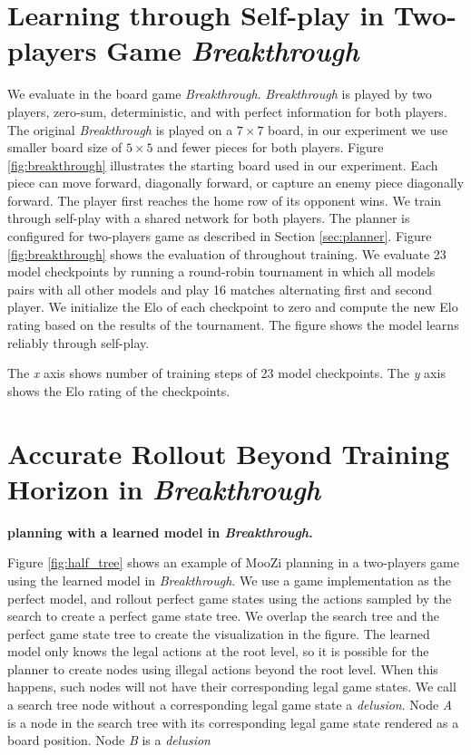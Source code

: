 \section{\moozi Learning through Self-play in Two-players Game \textit{Breakthrough}} \label{sec:exp:breakthrough}
We evaluate \moozi in the board game \textit{Breakthrough}.
\textit{Breakthrough} is played by two players, zero-sum, deterministic, and with perfect information for both players.
The original \textit{Breakthrough} is played on a $7 \times 7$ board, in our experiment we use smaller board size of \(5 \times 5\) and fewer pieces for both players.
Figure \ref{fig:breakthrough} illustrates the starting board used in our experiment.
Each piece can move forward, diagonally forward, or capture an enemy piece diagonally forward.
The player first reaches the home row of its opponent wins.
We train \moozi through self-play with a shared network for both players.
The planner is configured for two-players game as described in Section \ref{sec:planner}.
Figure \ref{fig:breakthrough} shows the evaluation of \moozi throughout training.
We evaluate 23 model checkpoints by running a round-robin tournament in which all models pairs with all other models and play 16 matches alternating first and second player.
We initialize the Elo of each checkpoint to zero and compute the new Elo rating based on the results of the tournament.
The figure shows the model learns reliably through self-play.

{
    The \textit{x} axis shows number of training steps of 23 model checkpoints.
    The \textit{y} axis shows the Elo rating of the checkpoints.
}


\section{Accurate Rollout Beyond Training Horizon in \textit{Breakthrough}}
    \textbf{\moozi planning with a learned model in \textit{Breakthrough}.
}

Figure \ref{fig:half_tree} shows an example of MooZi planning in a two-players game using the learned model in \textit{Breakthrough}.
We use a game implementation as the perfect model, and rollout perfect game states using the actions sampled by the search to create a perfect game state tree.
We overlap the \moozi search tree and the perfect game state tree to create the visualization in the figure.
The learned model only knows the legal actions at the root level, so it is possible for the planner to create nodes using illegal actions beyond the root level.
When this happens, such nodes will not have their corresponding legal game states.
We call a search tree node without a corresponding legal game state a \textit{delusion}.
Node \textit{A} is a node in the search tree with its corresponding legal game state rendered as a board position.
Node \textit{B} is a \textit{delusion}

